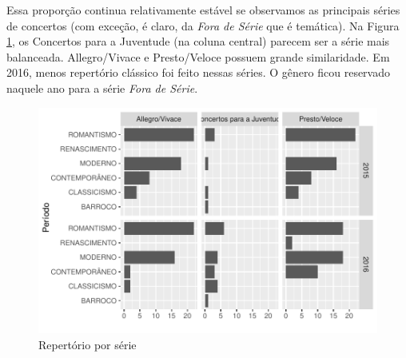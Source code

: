\documentclass[a4paper, 12pt, openright, oneside, german, french, english, brazil]{abntex2}
\begin{document}
	
	
	Essa proporção continua relativamente estável se observamos as principais séries de concertos (com exceção, é claro, da \textit{Fora de Série} que é temática). Na Figura \ref{repertoire-perseries}, os Concertos para a Juventude (na coluna central) parecem ser a série mais balanceada. Allegro/Vivace e Presto/Veloce possuem grande similaridade. Em 2016, menos repertório clássico foi feito nessas séries. O gênero ficou reservado naquele ano para a série \textit{Fora de Série}.
	
	\begin{figure}[!h]
		\centering
		\caption{Repertório por série}
		\label{repertoire-perseries}
		\includegraphics[scale=0.7]{periodo_perserie_year.pdf}
	\end{figure}
	
	
	
\end{document}
